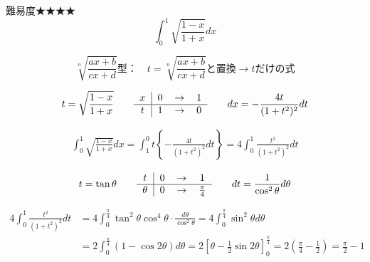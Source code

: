 \documentclass[main]{subfiles}
\begin{document}

\begin{mondai}{難易度★★★★}{}
    $$\int ^1_0 \sqrt{\frac{1-x}{1+x}} dx$$
    
    \tcblower
    
    \begin{pointbox}
        \begin{center}
        $$\sqrt[n]{\frac{ax+b}{cx+d}}\text{型：}\quad t=\sqrt[n]{\frac{ax+b}{cx+d}}\text{と置換}\rightarrow  t\text{だけの式}$$
        \end{center}
    \end{pointbox}

    \begin{tcolorbox}
        \begin{align*}
            t=\sqrt{\frac{1-x}{1+x}} \qquad 
            \begin{tabular}{c|ccc}
                $x$ & $0$ & $\rightarrow$ & $1$ \\ \hline
                $t$ & $1$ & $\rightarrow$ & $0$ \\
            \end{tabular} \qquad
            dx=-\frac{4t}{(1+t^2)^2}dt
        \end{align*}
    \end{tcolorbox}
    \begin{align*}
        \int ^1_0 \sqrt{\frac{1-x}{1+x}} dx
            = \int ^0_1 t \left\{ -\frac{4t}{(1+t^2)^2}dt \right\}
            = 4 \int ^1_0 \frac{t^2}{(1+t^2)^2}dt
    \end{align*}
    \begin{tcolorbox}
        \begin{align*}
            t=\tan\theta \qquad 
            \begin{tabular}{c|ccc}
                $t$ & $0$ & $\rightarrow$ & $1$ \\ \hline
                $\theta$ & $0$ & $\rightarrow$ & $\frac{\pi}{4}$ \\
            \end{tabular} \qquad
            dt=\frac{1}{\cos^2\theta}d\theta
        \end{align*}
    \end{tcolorbox}
    \begin{align*}
        4 \int ^1_0 \frac{t^2}{(1+t^2)^2}dt
            &= 4\int^{\frac{\pi}{4}}_0 \tan^2\theta\cos^4\theta\cdot\frac{d\theta}{\cos^2\theta}
            = 4\int^{\frac{\pi}{4}}_0 \sin^2\theta d\theta \\
            &= 2\int^{\frac{\pi}{4}}_0 \left(1-\cos 2\theta\right) d\theta
            = 2\left[ \theta-\frac{1}{2}\sin 2\theta \right]_0^{\frac{\pi}{4}}
            = 2\left( \frac{\pi}{4}-\frac{1}{2} \right)
            = \frac{\pi}{2}-1 \tag{答}
    \end{align*}


\end{mondai}
\end{document}
